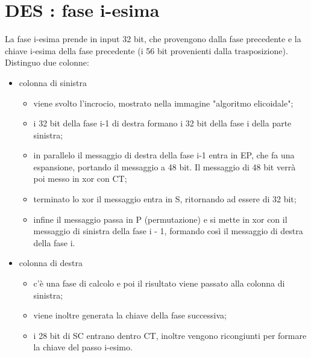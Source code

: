\section{DES : fase i-esima}

La fase i-esima prende in input 32 bit, che provengono dalla fase precedente e la chiave i-esima della fase precedente (i 56 bit provenienti dalla trasposizione). Distinguo due colonne:
\begin{itemize}
	\item colonna di sinistra
	\begin{itemize}
		\item viene svolto l'incrocio, mostrato nella immagine "algoritmo elicoidale";
		\item i 32 bit della fase i-1 di destra formano i 32 bit della fase i della parte sinistra;
		\item in parallelo il messaggio di destra della fase i-1 entra in EP, che fa una espansione, portando il messaggio a 48 bit. Il messaggio di 48 bit verrà poi messo in xor con CT;
		\item terminato lo xor il messaggio entra in S, ritornando ad essere di 32 bit;
		\item infine il messaggio passa in P (permutazione) e si mette in xor con il messaggio di sinistra della fase i - 1, formando così il messaggio di destra della fase i.
	\end{itemize}
	\item colonna di destra
	\begin{itemize}
		\item c'è una fase di calcolo e poi il risultato viene passato alla colonna di sinistra;
		\item viene inoltre generata la chiave della fase successiva;
		\item i 28 bit di SC entrano dentro CT, inoltre vengono ricongiunti per formare la chiave del passo i-esimo.
	\end{itemize}
\end{itemize}

